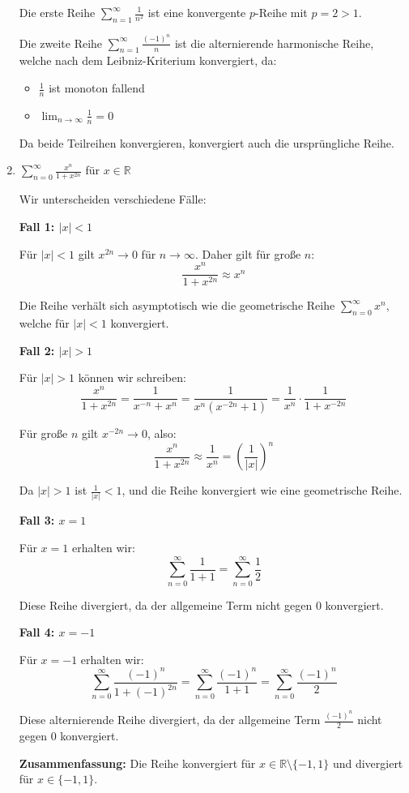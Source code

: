 \documentclass[11pt]{article}
\begin{document}
\begin{enumerate}[label=(\alph*)]
Die erste Reihe $\sum_{n=1}^\infty \frac{1}{n^2}$ ist eine konvergente $p$-Reihe mit $p = 2 > 1$.

Die zweite Reihe $\sum_{n=1}^\infty \frac{(-1)^n}{n}$ ist die alternierende harmonische Reihe, welche nach dem Leibniz-Kriterium konvergiert, da:
\begin{itemize}
\item $\frac{1}{n}$ ist monoton fallend
\item $\lim_{n \to \infty} \frac{1}{n} = 0$
\end{itemize}

Da beide Teilreihen konvergieren, konvergiert auch die ursprüngliche Reihe.

\item $\displaystyle \sum_{n=0}^\infty \frac{x^n}{1+x^{2n}}$ für $x \in \mathbb{R}$

Wir unterscheiden verschiedene Fälle:

\textbf{Fall 1: $|x| < 1$}

Für $|x| < 1$ gilt $x^{2n} \to 0$ für $n \to \infty$. Daher gilt für große $n$:
\[
\frac{x^n}{1+x^{2n}} \approx x^n
\]

Die Reihe verhält sich asymptotisch wie die geometrische Reihe $\sum_{n=0}^\infty x^n$, welche für $|x| < 1$ konvergiert.

\textbf{Fall 2: $|x| > 1$}

Für $|x| > 1$ können wir schreiben:
\[
\frac{x^n}{1+x^{2n}} = \frac{1}{x^{-n} + x^n} = \frac{1}{x^n(x^{-2n} + 1)} = \frac{1}{x^n} \cdot \frac{1}{1 + x^{-2n}}
\]

Für große $n$ gilt $x^{-2n} \to 0$, also:
\[
\frac{x^n}{1+x^{2n}} \approx \frac{1}{x^n} = \left(\frac{1}{|x|}\right)^n
\]

Da $|x| > 1$ ist $\frac{1}{|x|} < 1$, und die Reihe konvergiert wie eine geometrische Reihe.

\textbf{Fall 3: $x = 1$}

Für $x = 1$ erhalten wir:
\[
\sum_{n=0}^\infty \frac{1}{1+1} = \sum_{n=0}^\infty \frac{1}{2}
\]

Diese Reihe divergiert, da der allgemeine Term nicht gegen 0 konvergiert.

\textbf{Fall 4: $x = -1$}

Für $x = -1$ erhalten wir:
\[
\sum_{n=0}^\infty \frac{(-1)^n}{1+(-1)^{2n}} = \sum_{n=0}^\infty \frac{(-1)^n}{1+1} = \sum_{n=0}^\infty \frac{(-1)^n}{2}
\]

Diese alternierende Reihe divergiert, da der allgemeine Term $\frac{(-1)^n}{2}$ nicht gegen 0 konvergiert.

\textbf{Zusammenfassung:} Die Reihe konvergiert für $x \in \mathbb{R} \setminus \{-1, 1\}$ und divergiert für $x \in \{-1, 1\}$.

\end{enumerate}
\end{document}

